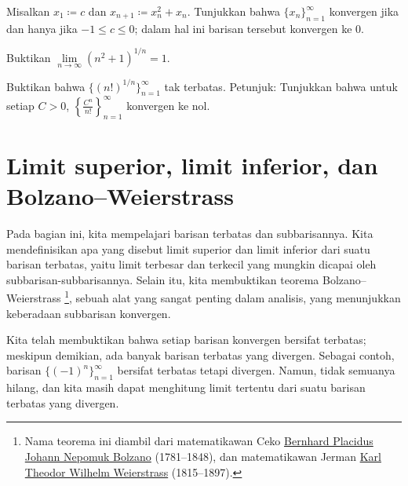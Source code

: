 \begin{exercise} \label{exercise:convergentinitialvalues}
Misalkan $x_1 \coloneqq c$ dan $x_{n+1} \coloneqq x_n^2+x_n$.
Tunjukkan bahwa $\{ x_n \}_{n=1}^\infty$ konvergen jika dan hanya jika $-1 \leq c \leq 0$; dalam
hal ini barisan tersebut konvergen ke 0.
\end{exercise}

\begin{exercise}
Buktikan $\lim\limits_{n \to \infty} {(n^2+1)}^{1/n} = 1$.
\end{exercise}

\begin{exercise}
Buktikan bahwa $\bigl\{ {(n!)}^{1/n} \bigr\}_{n=1}^\infty$
tak terbatas.
Petunjuk: Tunjukkan bahwa untuk setiap $C > 0$, $\left\{ \frac{C^n}{n!}
\right\}_{n=1}^\infty$ konvergen ke nol.
\end{exercise}


\sectionnewpage
\section{Limit superior, limit inferior, dan Bolzano--Weierstrass}
\label{sec:bw}



Pada bagian ini, kita mempelajari barisan terbatas dan subbarisannya.
Kita mendefinisikan apa yang disebut limit superior dan limit inferior
dari suatu barisan terbatas, yaitu limit terbesar dan terkecil
yang mungkin dicapai oleh subbarisan-subbarisannya.
Selain itu, kita membuktikan
teorema Bolzano--Weierstrass%
\footnote{%
Nama teorema ini diambil dari matematikawan Ceko
\href{https://en.wikipedia.org/wiki/Bernard_Bolzano}{Bernhard Placidus Johann Nepomuk Bolzano}
(1781--1848), dan matematikawan Jerman
\href{https://en.wikipedia.org/wiki/Karl_Weierstrass}{Karl Theodor Wilhelm Weierstrass}
(1815--1897).}, sebuah
alat yang sangat penting dalam analisis, yang menunjukkan keberadaan
subbarisan konvergen.

Kita telah membuktikan bahwa setiap barisan konvergen bersifat terbatas; meskipun demikian,
ada banyak barisan terbatas yang divergen.  Sebagai contoh,
barisan $\bigl\{ {(-1)}^n \bigr\}_{n=1}^\infty$ bersifat terbatas
tetapi divergen.  Namun, tidak semuanya hilang, dan kita
masih dapat menghitung limit tertentu dari suatu barisan terbatas yang divergen.

